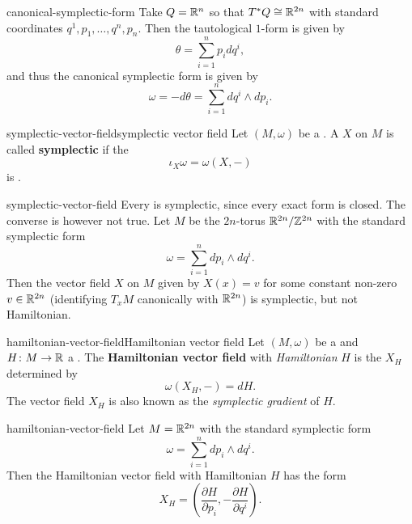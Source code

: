 \begin{example}{canonical-symplectic-form}
    Take $Q = \mathbb{R}^n$ so that $T^* Q \cong \mathbb{R}^{2n}$ with standard coordinates $q^1, p_1, \ldots, q^n, p_n$. Then the tautological $1$-form is given by
    \[ \theta = \sum_{i = 1}^{n} p_i dq^i , \]
    and thus the canonical symplectic form is given by
    \[ \omega = -d \theta = \sum_{i = 1}^{n} d q^i \wedge d p_i. \]
\end{example}

\begin{topic}{symplectic-vector-field}{symplectic vector field}
    Let $(M, \omega)$ be a . A  $X$ on $M$ is called \textbf{symplectic} if the 
    \[ \iota_X \omega = \omega(X, -) \]
    is .
\end{topic}

\begin{example}{symplectic-vector-field}
    Every  is symplectic, since every exact form is closed. The converse is however not true. Let $M$ be the $2n$-torus $\mathbb{R}^{2n}/\mathbb{Z}^{2n}$ with the standard symplectic form
    \[ \omega = \sum_{i = 1}^{n} dp_i \wedge dq^i . \]
    Then the vector field $X$ on $M$ given by $X(x) = v$ for some constant non-zero $v \in \mathbb{R}^{2n}$ (identifying $T_x M$ canonically with $\mathbb{R}^{2n}$) is symplectic, but not Hamiltonian.
\end{example}

\begin{topic}{hamiltonian-vector-field}{Hamiltonian vector field}
    Let $(M, \omega)$ be a  and $H \colon M \to \mathbb{R}$ a . The \textbf{Hamiltonian vector field} with \textit{Hamiltonian} $H$ is the  $X_H$ determined by
    \[ \omega(X_H, -) = dH . \]
    The vector field $X_H$ is also known as the \textit{symplectic gradient} of $H$.
\end{topic}

\begin{example}{hamiltonian-vector-field}
    Let $M = \mathbb{R}^{2n}$ with the standard symplectic form
    \[ \omega = \sum_{i = 1}^{n} dp_i \wedge dq^i . \]
    Then the Hamiltonian vector field with Hamiltonian $H$ has the form
    \[ X_H = \left(\frac{\partial H}{\partial p_i}, -\frac{\partial H}{\partial q^i} \right) . \]
\end{example}

